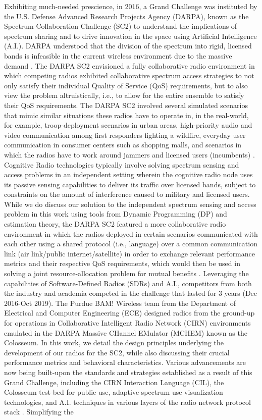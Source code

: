 Exhibiting much-needed prescience, in 2016, a Grand Challenge was instituted by the U.S. Defense Advanced Research Projects Agency (DARPA), known as the Spectrum Collaboration Challenge (SC2) to understand the implications of spectrum sharing and to drive innovation in the space using Artificial Intelligence (A.I.). DARPA understood that the division of the spectrum into rigid, licensed bands is infeasible in the current wireless environment due to the massive demand \cite{DARPA:SC2}. The DARPA SC2 envisioned a fully collaborative radio environment in which competing radios exhibited collaborative spectrum access strategies to not only satisfy their individual Quality of Service (QoS) requirements, but to also view the problem altruistically, i.e., to allow for the entire ensemble to satisfy their QoS requirements. The DARPA SC2 involved several simulated scenarios that mimic similar situations these radios have to operate in, in the real-world, for example, troop-deployment scenarios in urban areas, high-priority audio and video communication among first responders fighting a wildfire, everyday user communication in consumer centers such as shopping malls, and scenarios in which the radios have to work around jammers and licensed users (incumbents) \cite{DARPA:SC2scenarios}. Cognitive Radio technologies typically involve solving spectrum sensing and access problems in an independent setting wherein the cognitive radio node uses its passive sensing capabilities to deliver its traffic over licensed bands, subject to constraints on the amount of interference caused to military and licensed users. While we do discuss our solution to the independent spectrum sensing and access problem in this work using tools from Dynamic Programming (DP) and estimation theory, the DARPA SC2 featured a more collaborative radio environment in which the radios deployed in certain scenarios communicated with each other using a shared protocol (i.e., language) over a common communication link (air link/public internet/satellite) in order to exchange relevant performance metrics and their respective QoS requirements, which would then be used in solving a joint resource-allocation problem for mutual benefits \cite{DARPA:SC2collaboration}. Leveraging the capabilities of Software-Defined Radios (SDRs) and A.I., competitors from both the industry and academia competed in the challenge that lasted for 3 years (Dec 2016-Oct 2019). The Purdue BAM! Wireless team from the Department of Electrical and Computer Engineering (ECE) designed radios from the ground-up for operations in Collaborative Intelligent Radio Network (CIRN) environments emulated in the DARPA Massive CHannel EMulator (MCHEM) known as the Colosseum. In this work, we detail the design principles underlying the development of our radios for the SC2, while also discussing their crucial performance metrics and behavioral characteristics. Various advancements are now being built-upon the standards and strategies established as a result of this Grand Challenge, including the CIRN Interaction Language (CIL), the Colosseum test-bed for public use, adaptive spectrum use visualization technologies, and A.I. techniques in various layers of the radio network protocol stack \cite{DARPASC2:end1,DARPASC2:end2,DARPASC2:end3,DARPASC2:end4}. Simplifying the 